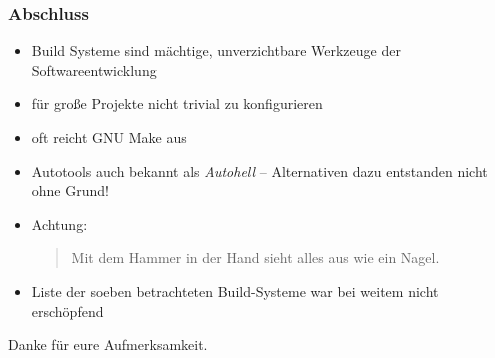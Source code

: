 \begin{frame}
	\frametitle{Abschluss}
	\begin{itemize}
		\item Build Systeme sind mächtige, unverzichtbare Werkzeuge der Softwareentwicklung
		\item für große Projekte nicht trivial zu konfigurieren
		\item oft reicht GNU Make aus
		\item Autotools auch bekannt als \emph{Autohell} -- Alternativen dazu entstanden nicht ohne Grund!
		\item Achtung: \begin{quote} Mit dem Hammer in der Hand sieht alles aus wie ein Nagel. \end{quote}
		\item Liste der soeben betrachteten Build-Systeme war bei weitem nicht erschöpfend
	\end{itemize}
\end{frame}

\begin{frame}[plain]
	\huge
	\center
	Danke für eure Aufmerksamkeit.
\end{frame}
